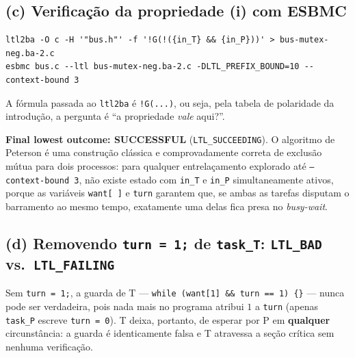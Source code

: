 \documentclass[12pt,a4paper]{article}
\newcommand{\vv}[1]{\texttt{#1}}
\begin{document}
\subsection{(c) Verifica\c{c}\~ao da propriedade (i) com ESBMC}

\begin{lstlisting}[style=shstyle]
ltl2ba -O c -H '"bus.h"' -f '!G(!({in_T} && {in_P}))' > bus-mutex-neg.ba-2.c
esbmc bus.c --ltl bus-mutex-neg.ba-2.c -DLTL_PREFIX_BOUND=10 --context-bound 3
\end{lstlisting}

A f\'ormula passada ao \texttt{ltl2ba} \'e \texttt{!G(...)}, ou seja, pela tabela de
polaridade da introdu\c{c}\~ao, a pergunta \'e ``a propriedade \emph{vale} aqui?''.

\begin{tcolorbox}[resultbox]
\textbf{Final lowest outcome: SUCCESSFUL} (\texttt{LTL\_SUCCEEDING}). O algoritmo de
Peterson \'e uma constru\c{c}\~ao cl\'assica e comprovadamente correta de exclus\~ao
m\'utua para dois processos: para qualquer entrela\c{c}amento explorado at\'e
\texttt{--context-bound 3}, n\~ao existe estado com \vv{in\_T} e \vv{in\_P} simultaneamente
ativos, porque as vari\'aveis \vv{want[\,]} e \vv{turn} garantem que, se ambas as tarefas
disputam o barramento ao mesmo tempo, exatamente uma delas fica presa no \emph{busy-wait}.
\end{tcolorbox}

\subsection{(d) Removendo \texttt{turn = 1;} de \texttt{task\_T}: \texttt{LTL\_BAD} vs.\ \texttt{LTL\_FAILING}}

Sem \texttt{turn = 1;}, a guarda de T ---
\texttt{while (want[1] \&\& turn == 1) \{\}} --- nunca pode ser verdadeira, pois nada mais
no programa atribui $1$ a \vv{turn} (apenas \vv{task\_P} escreve \vv{turn = 0}). T deixa,
portanto, de esperar por P em \textbf{qualquer} circunst\^ancia: a guarda \'e
identicamente falsa e T atravessa a se\c{c}\~ao cr\'itica sem nenhuma verifica\c{c}\~ao.
\end{document}
